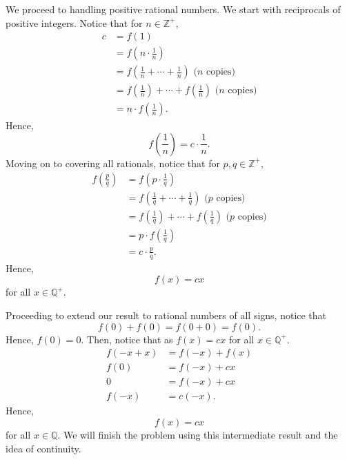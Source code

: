 \documentclass{article}
\begin{document}
\bigskip

We proceed to handling positive rational numbers. We start with reciprocals of positive integers. Notice that for $n \in \mathbb{Z^+}$,
\begin{equation*}
    \begin{split}
        c &= f(1) \\
        &= f \left( n \cdot \frac{1}{n} \right) \\
        &= f \left( \frac{1}{n} + \cdots + \frac{1}{n} \right) \text{ ($n$ copies)} \\
        &= f \left( \frac{1}{n} \right) + \cdots + f \left( \frac{1}{n} \right) \text{ ($n$ copies)} \\
        &= n \cdot f \left( \frac{1}{n} \right) \text{.}
    \end{split}
\end{equation*}
Hence,
\[
    f \left( \frac{1}{n} \right) = c \cdot \frac{1}{n} \text{.}
\]
Moving on to covering all rationals, notice that for $p, q \in \mathbb{Z^+}$,
\begin{equation*}
    \begin{split}
        f \left( \frac{p}{q} \right) &= f \left( p \cdot \frac{1}{q} \right) \\
        &= f \left( \frac{1}{q} + \cdots + \frac{1}{q} \right) \text{ ($p$ copies)} \\
        &= f \left( \frac{1}{q} \right) + \cdots + f \left( \frac{1}{q} \right) \text{ ($p$ copies)} \\
        &= p \cdot f \left( \frac{1}{q} \right) \\
        &= c \cdot \frac{p}{q} \text{.}
    \end{split}
\end{equation*}
Hence,
\[
    f(x) = cx
\]
for all $x \in \mathbb{Q^+}$.

\bigskip

Proceeding to extend our result to rational numbers of all signs, notice that
\[
    f(0) + f(0) = f(0 + 0) = f(0) \text{.}
\]
Hence, $f(0) = 0$. Then, notice that as $f(x) = cx$ for all $x \in \mathbb{Q^+}$.
\begin{equation*}
    \begin{split}
        f(-x + x) & = f(-x) + f(x) \\
        f(0) &= f(-x) + cx \\
        0 &= f(-x) + cx \\
        f(-x) &= c(-x) \text{.}
    \end{split}
\end{equation*}
Hence,
\[
    f(x) = cx
\]
for all $x \in \mathbb{Q}$. We will finish the problem using this intermediate result and the idea of continuity.
\end{document}
